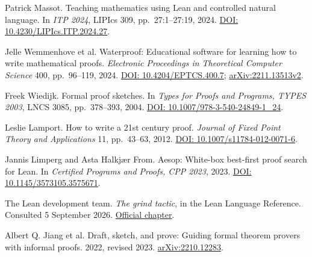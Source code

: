 \documentclass[11pt,a4paper]{article}
\newcommand{\source}[2]{\href{#1}{#2}}
\begin{document}
\begin{thebibliography}{99}
Patrick Massot.
Teaching mathematics using Lean and controlled natural language.
In \emph{ITP 2024}, LIPIcs 309, pp.~27:1--27:19, 2024.
\source{https://doi.org/10.4230/LIPIcs.ITP.2024.27}{DOI: 10.4230/LIPIcs.ITP.2024.27}.

Jelle Wemmenhove et al.
Waterproof: Educational software for learning how to write mathematical proofs.
\emph{Electronic Proceedings in Theoretical Computer Science} 400, pp.~96--119, 2024.
\source{https://doi.org/10.4204/EPTCS.400.7}{DOI: 10.4204/EPTCS.400.7};
\source{https://arxiv.org/abs/2211.13513v2}{arXiv:2211.13513v2}.

Freek Wiedijk.
Formal proof sketches.
In \emph{Types for Proofs and Programs, TYPES 2003}, LNCS 3085, pp.~378--393, 2004.
\source{https://doi.org/10.1007/978-3-540-24849-1_24}{DOI: 10.1007/978-3-540-24849-1\_24}.

Leslie Lamport.
How to write a 21st century proof.
\emph{Journal of Fixed Point Theory and Applications} 11, pp.~43--63, 2012.
\source{https://doi.org/10.1007/s11784-012-0071-6}{DOI: 10.1007/s11784-012-0071-6}.

Jannis Limperg and Asta Halkj\ae r From.
Aesop: White-box best-first proof search for Lean.
In \emph{Certified Programs and Proofs, CPP 2023}, 2023.
\source{https://doi.org/10.1145/3573105.3575671}{DOI: 10.1145/3573105.3575671}.

The Lean development team.
\emph{The grind tactic}, in the Lean Language Reference.
Consulted 5 September 2026.
\source{https://lean-lang.org/doc/reference/latest/The--grind--tactic/}{Official chapter}.

Albert Q. Jiang et al.
Draft, sketch, and prove: Guiding formal theorem provers with informal proofs.
2022, revised 2023.
\source{https://arxiv.org/abs/2210.12283}{arXiv:2210.12283}.

\end{thebibliography}
\end{document}
